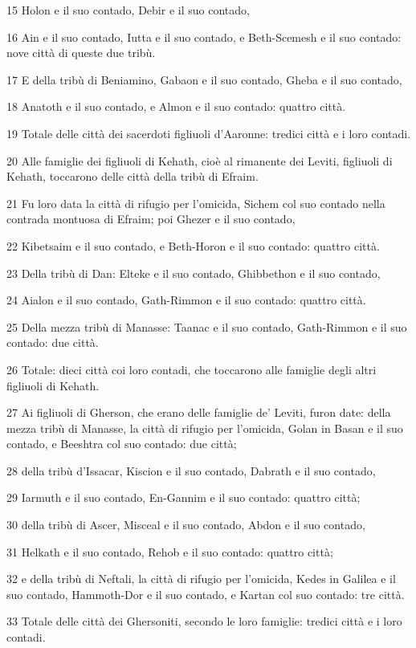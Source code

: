 \par 15 Holon e il suo contado, Debir e il suo contado,
\par 16 Ain e il suo contado, Iutta e il suo contado, e Beth-Scemesh e il suo contado: nove città di queste due tribù.
\par 17 E della tribù di Beniamino, Gabaon e il suo contado, Gheba e il suo contado,
\par 18 Anatoth e il suo contado, e Almon e il suo contado: quattro città.
\par 19 Totale delle città dei sacerdoti figliuoli d'Aaronne: tredici città e i loro contadi.
\par 20 Alle famiglie dei figliuoli di Kehath, cioè al rimanente dei Leviti, figliuoli di Kehath, toccarono delle città della tribù di Efraim.
\par 21 Fu loro data la città di rifugio per l'omicida, Sichem col suo contado nella contrada montuosa di Efraim; poi Ghezer e il suo contado,
\par 22 Kibetsaim e il suo contado, e Beth-Horon e il suo contado: quattro città.
\par 23 Della tribù di Dan: Elteke e il suo contado, Ghibbethon e il suo contado,
\par 24 Aialon e il suo contado, Gath-Rimmon e il suo contado: quattro città.
\par 25 Della mezza tribù di Manasse: Taanac e il suo contado, Gath-Rimmon e il suo contado: due città.
\par 26 Totale: dieci città coi loro contadi, che toccarono alle famiglie degli altri figliuoli di Kehath.
\par 27 Ai figliuoli di Gherson, che erano delle famiglie de' Leviti, furon date: della mezza tribù di Manasse, la città di rifugio per l'omicida, Golan in Basan e il suo contado, e Beeshtra col suo contado: due città;
\par 28 della tribù d'Issacar, Kiscion e il suo contado, Dabrath e il suo contado,
\par 29 Iarmuth e il suo contado, En-Gannim e il suo contado: quattro città;
\par 30 della tribù di Ascer, Misceal e il suo contado, Abdon e il suo contado,
\par 31 Helkath e il suo contado, Rehob e il suo contado: quattro città;
\par 32 e della tribù di Neftali, la città di rifugio per l'omicida, Kedes in Galilea e il suo contado, Hammoth-Dor e il suo contado, e Kartan col suo contado: tre città.
\par 33 Totale delle città dei Ghersoniti, secondo le loro famiglie: tredici città e i loro contadi.
